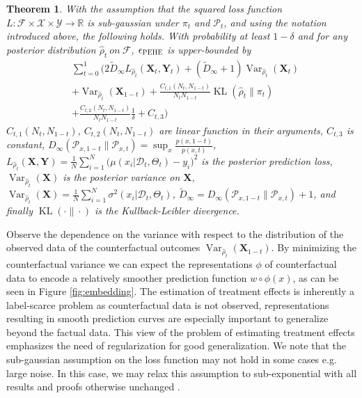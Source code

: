 \documentclass[twoside]{article}
\newtheorem{theorem}{Theorem}
\newcommand{\Var}{\mathop{\mathrm{Var}}}
\newcommand{\KL}{\mathop{\mathrm{KL}}}
\begin{document}
\begin{theorem}\label{thm:thm1} With the assumption that the squared loss function $L:\mathcal{F}\times \mathcal{X}\times\mathcal{Y}\rightarrow\mathbb{R}$ is sub-gaussian under $\pi_t$ and $\mathcal{P}_t$, and using the notation introduced above, the following holds. With probability at least $1-\delta$ and for any posterior distribution $\hat{\rho}_t \ on \ \mathcal{F}$, $\epsilon_{\textsc{PEHE}}$ is upper-bounded by
\begin{align}\label{equ:thm1}
  &\sum_{t=0}^{1}\Bigg(2\tilde{D}_{\infty} L_{\hat{\rho}_t} (\mathbf{X}_t,\mathbf{Y}_t) + (\tilde{D}_{\infty}+1){\Var}_{\hat{\rho}_t}(\mathbf{X}_{t}) \nonumber\\
	  & + {\Var}_{\hat{\rho}_t}(\mathbf{X}_{1-t})+	\frac{C_{t,1}(N_t,N_{1-t})}{N_t N_{1-t} }\KL(\hat{\rho}_t\|\pi_t) \nonumber\\ 
	  &+ \frac{C_{t,2}(N_t,N_{1-t})}{N_t N_{1-t}}\frac{1}{\delta}+C_{t,3} \Bigg)
\end{align}
$C_{t,1}(N_t,N_{1-t})$, $C_{t,2}(N_t,N_{1-t})$ are linear function in their arguments, $C_{t,3}$ is constant, $D_{\infty}(\mathcal{P}_{x,1-t}\|\mathcal{P}_{x,t})={\sup}_{x}\frac{p(x,1-t)}{p(x,t)}$, $L_{\hat{\rho}_t} (\mathbf{X},\mathbf{Y})= \frac{1}{N}\sum_{i=1}^{N} \big(\mu(x_{i}|\mathcal{D}_t,\Theta_t)-y_{i}\big)^2$ is the posterior prediction loss, ${\Var}_{\hat{\rho}_t}(\mathbf{X})$ is the posterior variance on $\mathbf{X}$, ${\Var}_{\hat{\rho}_t}(\mathbf{X})=\frac{1}{N}\sum_{i=1}^{N} \sigma^2(x_{i}|\mathcal{D}_t,\Theta_t)$, $\tilde{D}_{\infty}=D_{\infty}(\mathcal{P}_{x,1-t}\|\mathcal{P}_{x,t})+1$, and finally $\KL(\cdot\|\cdot)$ is the Kullback-Leibler divergence.
\end{theorem}

Observe the dependence on the variance with respect to the distribution of the observed data of the counterfactual outcomes ${\Var}_{\hat{\rho}_t}(\mathbf{X}_{1-t})$.  By minimizing the counterfactual variance we can expect the representations $\phi$ of counterfactual data to encode a relatively smoother prediction function $w \circ \phi (x)$, as can be seen in Figure \ref{fig:embedding}. The estimation of treatment effects is inherently a label-scarce problem as counterfactual data is not observed, representations resulting in smooth prediction curves are especially important to generalize beyond the factual data. This view of the problem of estimating treatment effects emphasizes the need of regularization for good generalization. We note that the sub-gaussian assumption on the loss function may not hold in some cases e.g. large noise. In this case, we may relax this assumption to sub-exponential with all results and proofs otherwise unchanged \cite{germain2016pac}.
\end{document}
